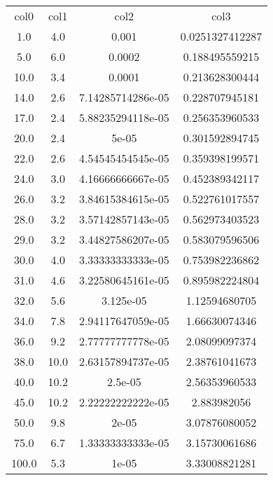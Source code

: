 \begin{table}
\begin{tabular}{cccc}
col0 & col1 & col2 & col3 \\
1.0 & 4.0 & 0.001 & 0.0251327412287 \\
5.0 & 6.0 & 0.0002 & 0.188495559215 \\
10.0 & 3.4 & 0.0001 & 0.213628300444 \\
14.0 & 2.6 & 7.14285714286e-05 & 0.228707945181 \\
17.0 & 2.4 & 5.88235294118e-05 & 0.256353960533 \\
20.0 & 2.4 & 5e-05 & 0.301592894745 \\
22.0 & 2.6 & 4.54545454545e-05 & 0.359398199571 \\
24.0 & 3.0 & 4.16666666667e-05 & 0.452389342117 \\
26.0 & 3.2 & 3.84615384615e-05 & 0.522761017557 \\
28.0 & 3.2 & 3.57142857143e-05 & 0.562973403523 \\
29.0 & 3.2 & 3.44827586207e-05 & 0.583079596506 \\
30.0 & 4.0 & 3.33333333333e-05 & 0.753982236862 \\
31.0 & 4.6 & 3.22580645161e-05 & 0.895982224804 \\
32.0 & 5.6 & 3.125e-05 & 1.12594680705 \\
34.0 & 7.8 & 2.94117647059e-05 & 1.66630074346 \\
36.0 & 9.2 & 2.77777777778e-05 & 2.08099097374 \\
38.0 & 10.0 & 2.63157894737e-05 & 2.38761041673 \\
40.0 & 10.2 & 2.5e-05 & 2.56353960533 \\
45.0 & 10.2 & 2.22222222222e-05 & 2.883982056 \\
50.0 & 9.8 & 2e-05 & 3.07876080052 \\
75.0 & 6.7 & 1.33333333333e-05 & 3.15730061686 \\
100.0 & 5.3 & 1e-05 & 3.33008821281 \\
\end{tabular}
\end{table}

